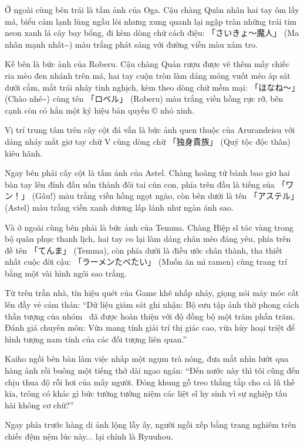 \documentclass[../main.tex]{subfiles}
\begin{document}
Ở ngoài cùng bên trái là tấm ảnh của Oga. Cậu chàng Quân nhân hai tay ôm lấy má, biểu cảm lạnh lùng ngầu lòi nhưng xung quanh lại ngập tràn những trái tim neon xanh lá cây bay bổng, đi kèm dòng chữ cách điệu: 「さいきょ～魔人」 (Ma nhân mạnh nhất\~{}) màu trắng phát sáng với đường viền màu xám tro.

Kế bên là bức ảnh của Roberu. Cậu chàng Quán rượu được vẽ thêm mấy chiếc ria mèo đen nhánh trên má, hai tay cuộn tròn làm dáng móng vuốt mèo áp sát dưới cằm, mắt trái nháy tinh nghịch, kèm theo dòng chữ mềm mại: 「ほなね～」 (Chào nhé\~{}) cùng tên 「ロベル」 (Roberu) màu trắng viền hồng rực rỡ, bên cạnh còn có hẳn một ký hiệu bản quyền © nhỏ xinh.

Vị trí trung tâm trên cây cột đá vẫn là bức ảnh quen thuộc của Arurandeisu với dáng nháy mắt giơ tay chữ V cùng dòng chữ 「独身貴族」 (Quý tộc độc thân) kiêu hãnh.

Ngay bên phải cây cột là tấm ảnh của Astel. Chàng hoàng tử bảnh bao giơ hai bàn tay lên đỉnh đầu uốn thành đôi tai cún con, phía trên đầu là tiếng sủa 「ワン！」 (Gâu!) màu trắng viền hồng ngọt ngào, còn bên dưới là tên 「アステル」 (Astel) màu trắng viền xanh dương lấp lánh như ngàn ánh sao.

Và ở ngoài cùng bên phải là bức ảnh của Temma. Chàng Hiệp sĩ tóc vàng trong bộ quân phục thanh lịch, hai tay co lại làm dáng chân mèo đáng yêu, phía trên đề tên 「てんま」 (Temma), còn phía dưới là điều ước chân thành, tha thiết nhất cuộc đời cậu: 「ラーメンたべたい」 (Muốn ăn mì ramen) cùng trang trí bằng một vài hình ngôi sao trắng.


Từ trên trần nhà, tín hiệu quét của Game khẽ nhấp nháy, giọng nói máy móc cất lên đầy vẻ cảm thán: ``Dữ liệu giám sát ghi nhận: Bộ sưu tập ảnh thờ phong cách thần tượng của nhóm \hls\ đã được hoàn thiện với độ đồng bộ một trăm phần trăm. Đánh giá chuyên môn: Vừa mang tính giải trí thị giác cao, vừa hủy hoại triệt để hình tượng nam tính của các đối tượng liên quan.''

Kaiho ngồi bên bàn làm việc nhấp một ngụm trà nóng, đưa mắt nhìn lướt qua hàng ảnh rồi buông một tiếng thở dài ngao ngán: ``Đến nước này thì tôi cũng đến chịu thua độ rỗi hơi của mấy người. Đóng khung gỗ treo thẳng tắp cho cả lũ thế kia, trông có khác gì bức tường tưởng niệm các liệt sĩ hy sinh vì sự nghiệp tấu hài không cơ chứ?''

Ngay phía trước hàng di ảnh lộng lẫy ấy, người ngồi xếp bằng trang nghiêm trên chiếc đệm nệm lúc này... lại chính là Ryuuhou.
\end{document}
